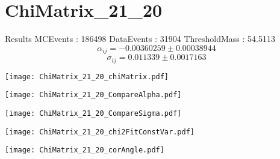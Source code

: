 \documentclass[a4paper,12pt]{article}
\begin{document}
\section{ChiMatrix\_21\_20}
\begin{minipage}{0.49\linewidth} Results \newline
MCEvents : 186498\newline
DataEvents : 31904 \newline
ThresholdMass : 54.5113\\
$$\alpha_{ij} = -0.00360259\pm 0.00038944$$
$$\sigma_{ij} = 0.011339\pm 0.0017163$$
\end{minipage}\hfill
\begin{minipage}{0.49\linewidth} 
\texttt{[image: ChiMatrix\_21\_20\_chiMatrix.pdf]}\\
\end{minipage}
\hfill
\begin{minipage}{0.49\linewidth} 
\texttt{[image: ChiMatrix\_21\_20\_CompareAlpha.pdf]}\\
\end{minipage}
\hfill
\begin{minipage}{0.49\linewidth} 
\texttt{[image: ChiMatrix\_21\_20\_CompareSigma.pdf]}\\
\end{minipage}
\begin{minipage}{0.49\linewidth} 
\texttt{[image: ChiMatrix\_21\_20\_chi2FitConstVar.pdf]}\\
\end{minipage}
\hfill
\begin{minipage}{0.49\linewidth} 
\texttt{[image: ChiMatrix\_21\_20\_corAngle.pdf]}\\
\end{minipage}
\end{document}
